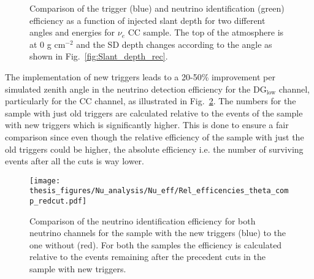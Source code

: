 \begin{figure}[h!]
  \centering
  \hfill
  \caption{Comparison of the trigger (blue) and neutrino identification (green) efficiency as a function of injected slant depth for two different angles and energies for $\nu_e$ CC sample. The top of the atmosphere is at 0 g cm$^{-2}$ and the SD depth changes according to the angle as shown in Fig.~\ref{fig:Slant_depth_rec}.} 
  \label{fig:Eff_X_comp}
\end{figure}

The implementation of new triggers leads to a 20-50\% improvement per simulated zenith angle in the neutrino detection efficiency for the DG$_{\mathrm{low}}$ channel, particularly for the CC channel, as illustrated in Fig.~\ref{fig:Eff_v_theta_channel_comp}. The numbers for the sample with just old triggers are calculated relative to the events of the sample with new triggers which is significantly higher. This is done to ensure a fair comparison since even though the relative efficiency of the sample with just the old triggers could be higher, the absolute efficiency i.e. the number of surviving events after all the cuts is way lower. 

\begin{figure}[h!]
  \centering
  \texttt{[image: thesis\_figures/Nu\_analysis/Nu\_eff/Rel\_efficencies\_theta\_comp\_redcut.pdf]}
  \caption{Comparison of the neutrino identification efficiency for both neutrino channels for the sample with the new triggers (blue) to the one without (red). For both the samples the efficiency is calculated relative to the events remaining after the precedent cuts in the sample with new triggers.}
  \label{fig:Eff_v_theta_channel_comp}
\end{figure}


